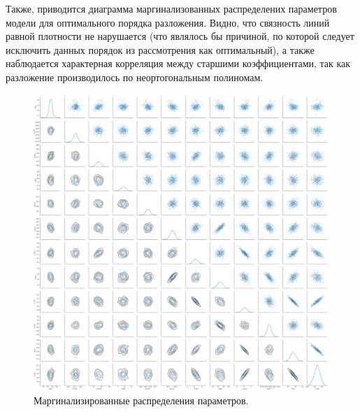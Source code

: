 \documentclass{matmex-diploma-custom}
\begin{document}
\pagebreak

Также, приводится диаграмма маргинализованных распределених параметров модели для оптимального порядка разложения. Видно, что связность линий равной плотности не нарушается (что являлось бы причиной, по которой следует исключить данных порядок из рассмотрения как оптимальный), а также наблюдается характерная корреляция между старшими коэффициентами, так как разложение производилось по неортогональным полиномам.
\begin{figure}[h!!]
\begin{center}
\begin{minipage}[h!!]{0.95\linewidth}
        \includegraphics[width=1.0\textwidth]{../imgs/pairplot.png}
\end{minipage}
\caption{Маргинализированные распределения параметров.}
\end{center}
\end{figure}



\pagebreak
\end{document}
